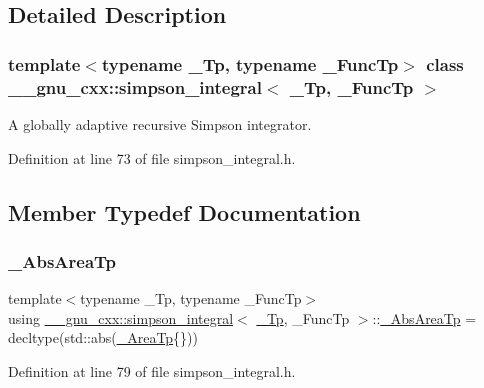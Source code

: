 \subsection{Detailed Description}
\subsubsection*{template$<$typename \+\_\+\+Tp, typename \+\_\+\+Func\+Tp$>$\newline
class \+\_\+\+\_\+gnu\+\_\+cxx\+::simpson\+\_\+integral$<$ \+\_\+\+Tp, \+\_\+\+Func\+Tp $>$}

A globally adaptive recursive Simpson integrator. 

Definition at line 73 of file simpson\+\_\+integral.\+h.



\subsection{Member Typedef Documentation}
\mbox{\label{class____gnu__cxx_1_1simpson__integral_a5c34021e2fac307bd282bf177db9e848}} 
\subsubsection{\texorpdfstring{\+\_\+\+Abs\+Area\+Tp}{\_AbsAreaTp}}
{\footnotesize\ttfamily template$<$typename \+\_\+\+Tp, typename \+\_\+\+Func\+Tp$>$ \\
using \hyperlink{class____gnu__cxx_1_1simpson__integral}{\+\_\+\+\_\+gnu\+\_\+cxx\+::simpson\+\_\+integral}$<$ \hyperlink{namespace____gnu__cxx_a3b19a9c800ca194374ef9172290f7d79}{\+\_\+\+Tp}, \+\_\+\+Func\+Tp $>$\+::\hyperlink{class____gnu__cxx_1_1simpson__integral_a5c34021e2fac307bd282bf177db9e848}{\+\_\+\+Abs\+Area\+Tp} =  decltype(std\+::abs(\hyperlink{class____gnu__cxx_1_1simpson__integral_a4d84c87903e8359f4a617e08703c15a1}{\+\_\+\+Area\+Tp}\{\}))}



Definition at line 79 of file simpson\+\_\+integral.\+h.

\mbox{\label{class____gnu__cxx_1_1simpson__integral_a4d84c87903e8359f4a617e08703c15a1}} 
